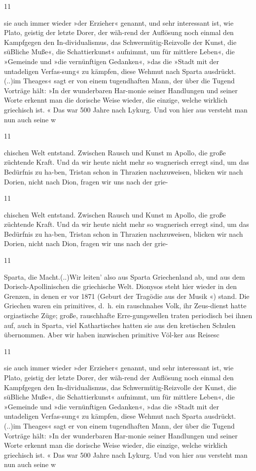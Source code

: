 \documentclass[
  letterpaper,
  DIV=11,
  numbers=noendperiod]{scrartcl}
\begin{document}
11

sie auch immer wieder »der Erzieher« genannt, und sehr interessant ist,
wie Plato, geistig der letzte Dorer, der wäh-rend der Auflösung noch
einmal den Kampfgegen den In-dividualismus, das Schwermütig-Reizvolle
der Kunst, die süBliche Muße«, die Schattierkunst« aufnimmt, um für
mittlere Leben«, die »Gemeinde und »die vernünftigen Gedanken«, »das die
»Stadt mit der untadeligen Verfas-sung« zu kämpfen, diese Wehmut nach
Sparta ausdrückt.(..)im Theages« sagt er von einem tugendhaften Mann,
der über die Tugend Vorträge hält: »In der wunderbaren Har-monie seiner
Handlungen und seiner Worte erkennt man die dorische Weise wieder, die
einzige, welche wirklich griechisch ist. « Das war 500 Jahre nach
Lykurg. Und von hier aus versteht man nun auch seine w

11

chischen Welt entstand. Zwischen Rausch und Kunst m Apollo, die große
züchtende Kraft. Und da wir heute nicht mehr so wagnerisch erregt sind,
um das Bedürfnis zu ha-ben, Tristan schon in Thrazien nachzuweisen,
blicken wir nach Dorien, nicht nach Dion, fragen wir uns nach der grie-

11

chischen Welt entstand. Zwischen Rausch und Kunst m Apollo, die große
züchtende Kraft. Und da wir heute nicht mehr so wagnerisch erregt sind,
um das Bedürfnis zu ha-ben, Tristan schon in Thrazien nachzuweisen,
blicken wir nach Dorien, nicht nach Dion, fragen wir uns nach der grie-

11

Sparta, die Macht.(..)Wir leiten' also aus Sparta Griechenland ab, und
aus dem Dorisch-Apollinischen die griechische Welt. Dionysos steht hier
wieder in den Grenzen, in denen er vor 1871 (Geburt der Tragödie aus der
Musik «) stand. Die Griechen waren ein primitives, d.~h. ein rauschnahes
Volk, ihr Zeus-dienst hatte orgiastische Züge; große, rauschhafte
Erre-gungswellen traten periodisch bei ihnen auf, auch in Sparta, viel
Kathartisches hatten sie aus den kretischen Schulen übernommen. Aber wir
haben inzwischen primitive Völ-ker aus Reisesc

11

sie auch immer wieder »der Erzieher« genannt, und sehr interessant ist,
wie Plato, geistig der letzte Dorer, der wäh-rend der Auflösung noch
einmal den Kampfgegen den In-dividualismus, das Schwermütig-Reizvolle
der Kunst, die süBliche Muße«, die Schattierkunst« aufnimmt, um für
mittlere Leben«, die »Gemeinde und »die vernünftigen Gedanken«, »das die
»Stadt mit der untadeligen Verfas-sung« zu kämpfen, diese Wehmut nach
Sparta ausdrückt.(..)im Theages« sagt er von einem tugendhaften Mann,
der über die Tugend Vorträge hält: »In der wunderbaren Har-monie seiner
Handlungen und seiner Worte erkennt man die dorische Weise wieder, die
einzige, welche wirklich griechisch ist. « Das war 500 Jahre nach
Lykurg. Und von hier aus versteht man nun auch seine w
\end{document}
